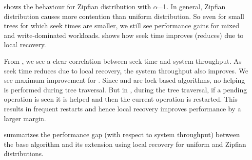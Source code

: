


 shows the behaviour for Zipfian distribution with $\alpha$=1. In general, Zipfian distribution causes more contention than uniform distribution. So even for small trees for which seek times are smaller, we still see performance gains for mixed and write-dominated workloads.  shows how seek time improves (reduces) due to local recovery. 

From , we see a clear correlation between seek time and system throughput. As seek time reduces due to local recovery, the system throughput also improves. We see maximum improvement for \HJBST{}. Since \CASTLE{} and \CITRUS{} are lock-based algorithms, no helping is performed during tree traversal.  But in \HJBST{}, during the tree traversal, if a pending operation is seen it is helped and then the current operation is restarted. This results in frequent restarts and hence local recovery improves performance by a larger margin.

 summarizes the performance gap (with respect to system throughput) between the base algorithm and its extension using local recovery for uniform and Zipfian distributions. 
